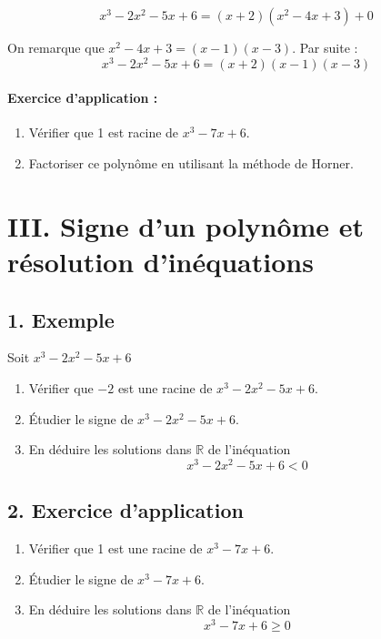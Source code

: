 \documentclass[12pt,a4paper]{article}
\newcounter{solution}
\newcounter{remarque}
\begin{document}
\[
x^3 - 2x^2 - 5x + 6 = (x + 2)(x^2 - 4x + 3) + 0
\]

On remarque que \( x^2 - 4x + 3 = (x - 1)(x - 3) \). Par suite :
\[
x^3 - 2x^2 - 5x + 6 = (x + 2)(x - 1)(x - 3)
\]

\paragraph{Exercice d'application :}
\begin{enumerate}
    \item Vérifier que 1 est racine de \( x^3 - 7x + 6 \).
    \item Factoriser ce polynôme en utilisant la méthode de Horner.
\end{enumerate}

\section*{III. Signe d'un polynôme et résolution d'inéquations}

\subsection*{1. Exemple}
Soit \( x^3 - 2x^2 - 5x + 6 \)

\begin{enumerate}
    \item Vérifier que \(-2\) est une racine de \( x^3 - 2x^2 - 5x + 6 \).
    \item Étudier le signe de \( x^3 - 2x^2 - 5x + 6 \).
    \item En déduire les solutions dans \( \mathbb{R} \) de l'inéquation
    \[
    x^3 - 2x^2 - 5x + 6 < 0
    \]
\end{enumerate}

\subsection*{2. Exercice d'application}

\begin{enumerate}
    \item Vérifier que 1 est une racine de \( x^3 - 7x + 6 \).
    \item Étudier le signe de \( x^3 - 7x + 6 \).
    \item En déduire les solutions dans \( \mathbb{R} \) de l'inéquation
    \[
    x^3 - 7x + 6 \geq 0
    \]
\end{enumerate}

\newpage
\end{document}
